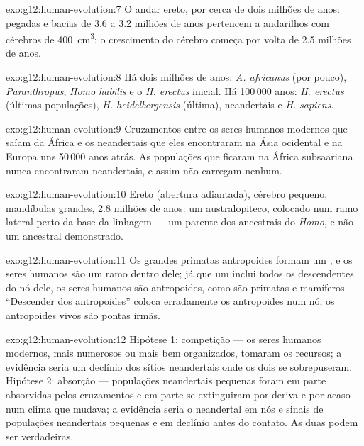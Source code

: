 \begin{solution}{exo:g12:human-evolution:7}
O andar ereto, por cerca de dois milhões de anos: pegadas e bacias de
3.6 a 3.2 milhões de anos pertencem a andarilhos com cérebros de
\qty{400}{cm^3}; o crescimento do cérebro começa por volta de 2.5
milhões de anos.
\end{solution}

\begin{solution}{exo:g12:human-evolution:8}
Há dois milhões de anos: \emph{A. africanus} (por pouco),
\emph{Paranthropus}, \emph{Homo habilis} e o \emph{H. erectus} inicial.
Há 100\,000 anos: \emph{H. erectus} (últimas populações),
\emph{H. heidelbergensis} (última), neandertais e \emph{H. sapiens}.
\end{solution}

\begin{solution}{exo:g12:human-evolution:9}
Cruzamentos entre os seres humanos modernos que saíam da África e os
neandertais que eles encontraram na Ásia ocidental e na Europa uns
50\,000 anos atrás. As populações que ficaram na África subsaariana
nunca encontraram neandertais, e assim não carregam nenhum.
\end{solution}

\begin{solution}{exo:g12:human-evolution:10}
Ereto (abertura adiantada), cérebro pequeno, mandíbulas grandes, 2.8
milhões de anos: um australopiteco, colocado num ramo lateral perto da
base da linhagem --- um parente dos ancestrais do \emph{Homo}, e não um
ancestral demonstrado.
\end{solution}

\begin{solution}{exo:g12:human-evolution:11}
Os grandes primatas antropoides formam um , e os seres humanos são
um ramo dentro dele; já que um  inclui todos os descendentes do nó
dele, os seres humanos são antropoides, como são primatas e mamíferos.
``Descender dos antropoides'' coloca erradamente os antropoides num nó;
os antropoides vivos são pontas irmãs.
\end{solution}

\begin{solution}{exo:g12:human-evolution:12}
Hipótese 1: competição --- os seres humanos modernos, mais numerosos ou
mais bem organizados, tomaram os recursos; a evidência seria um declínio
dos sítios neandertais onde os dois se sobrepuseram. Hipótese 2:
absorção --- populações neandertais pequenas foram em parte absorvidas
pelos cruzamentos e em parte se extinguiram por deriva e por acaso num
clima que mudava; a evidência seria o  neandertal em nós e sinais de
populações neandertais pequenas e em declínio antes do contato. As duas
podem ser verdadeiras.
\end{solution}

